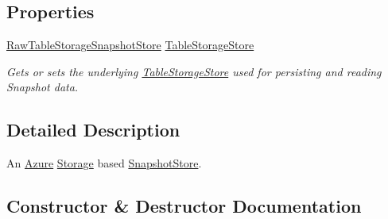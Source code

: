 \subsection*{Properties}
\begin{DoxyCompactItemize}
\item 
\hyperlink{classCqrs_1_1Azure_1_1BlobStorage_1_1Events_1_1TableStorageSnapshotStore_1_1RawTableStorageSnapshotStore}{Raw\+Table\+Storage\+Snapshot\+Store} \hyperlink{classCqrs_1_1Azure_1_1BlobStorage_1_1Events_1_1TableStorageSnapshotStore_a9b35cccc8db03b41466526f60767ed5f_a9b35cccc8db03b41466526f60767ed5f}{Table\+Storage\+Store}
\begin{DoxyCompactList}\small\item\em Gets or sets the underlying \hyperlink{classCqrs_1_1Azure_1_1BlobStorage_1_1TableStorageStore}{Table\+Storage\+Store} used for persisting and reading Snapshot data. \end{DoxyCompactList}\end{DoxyCompactItemize}


\subsection{Detailed Description}
An \hyperlink{namespaceCqrs_1_1Azure}{Azure} \hyperlink{namespaceCqrs_1_1Azure_1_1Storage}{Storage} based \hyperlink{classCqrs_1_1Snapshots_1_1SnapshotStore_aa8ab186f864443c7d9647a4522864a84_aa8ab186f864443c7d9647a4522864a84}{Snapshot\+Store}. 



\subsection{Constructor \& Destructor Documentation}
\mbox{\label{classCqrs_1_1Azure_1_1BlobStorage_1_1Events_1_1TableStorageSnapshotStore_aabf9c09c22958ca7acf6e717337a14d6_aabf9c09c22958ca7acf6e717337a14d6}} 
